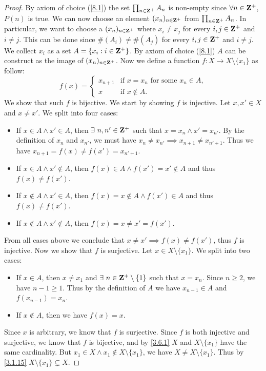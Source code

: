 \begin{proof}
  By axiom of choice (\cref{8.1}) the set \(\prod_{n \in \mathbf{Z}^+} A_n\) is non-empty since \(\forall n \in \mathbf{Z}^+\), \(P(n)\) is true.
  We can now choose an element \((x_n)_{n \in \mathbf{Z}^+}\) from \(\prod_{n \in \mathbf{Z}^+} A_n\).
  In particular, we want to choose a \((x_n)_{n \in \mathbf{Z}^+}\) where \(x_i \neq x_j\) for every \(i, j \in \mathbf{Z}^+\) and \(i \neq j\).
  This can be done since \(\#(A_i) \neq \#(A_j)\) for every \(i, j \in \mathbf{Z}^+\) and \(i \neq j\).
  We collect \(x_i\) as a set \(A = \{x_i : i \in \mathbf{Z}^+\}\).
  By axiom of choice (\cref{8.1}) \(A\) can be construct as the image of \((x_n)_{n \in \mathbf{Z}^+}\).
  Now we define a function \(f : X \to X \setminus \{x_1\}\) as follow:
  \[
    f(x) = \begin{cases}
      x_{n + 1} & \text{if } x = x_n \text{ for some } x_n \in A, \\
      x         & \text{if } x \notin A.
    \end{cases}
  \]
  We show that such \(f\) is bijective.
  We start by showing \(f\) is injective.
  Let \(x, x' \in X\) and \(x \neq x'\).
  We split into four cases:
  \begin{itemize}
    \item If \(x \in A \land x' \in A\), then \(\exists\ n, n' \in \mathbf{Z}^+\) such that \(x = x_n \land x' = x_{n'}\).
          By the definition of \(x_n\) and \(x_{n'}\), we must have \(x_n \neq x_{n'} \implies x_{n + 1} \neq x_{n' + 1}\).
          Thus we have \(x_{n + 1} = f(x) \neq f(x') = x_{n' + 1}\).
    \item If \(x \in A \land x' \notin A\), then \(f(x) \in A \land f(x') = x' \notin A\) and thus \(f(x) \neq f(x')\).
    \item If \(x \notin A \land x' \in A\), then \(f(x) = x \notin A \land f(x') \in A\) and thus \(f(x) \neq f(x')\).
    \item If \(x \notin A \land x' \notin A\), then \(f(x) = x \neq x' = f(x')\).
  \end{itemize}
  From all cases above we conclude that \(x \neq x' \implies f(x) \neq f(x')\), thus \(f\) is injective.
  Now we show that \(f\) is surjective.
  Let \(x \in X \setminus \{x_1\}\).
  We split into two cases:
  \begin{itemize}
    \item If \(x \in A\), then \(x \neq x_1\) and \(\exists\ n \in \mathbf{Z}^+ \setminus \{1\}\) such that \(x = x_n\).
          Since \(n \geq 2\), we have \(n - 1 \geq 1\).
          Thus by the definition of \(A\) we have \(x_{n - 1} \in A\) and \(f(x_{n - 1}) = x_n\).
    \item If \(x \notin A\), then we have \(f(x) = x\).
  \end{itemize}
  Since \(x\) is arbitrary, we know that \(f\) is surjective.
  Since \(f\) is both injective and surjective, we know that \(f\) is bijective, and by \cref{3.6.1} \(X\) and \(X \setminus \{x_1\}\) have the same cardinality.
  But \(x_1 \in X \land x_1 \notin X \setminus \{x_1\}\), we have \(X \neq X \setminus \{x_1\}\).
  Thus by \cref{3.1.15} \(X \setminus \{x_1\} \subsetneq X\).


\end{proof}
